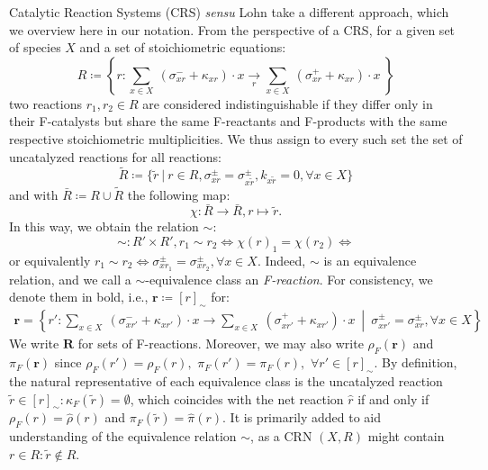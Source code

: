 \documentclass[pdflatex]{sn-jnl}
\theoremstyle{thmstyleone}%
\theoremstyle{examplesty}%
\theoremstyle{thmstylethree}%
\newcommand{\FR}[0]{\mathbf{R}}
\newcommand{\fr}[0]{\mathbf{r}}
\newcommand{\net}[1]{\hat{#1}}
\newcommand{\cat}{\kappa_F}
\newcommand{\ceducts}{\rho}
\newcommand{\cproducts}{\pi}
\newcommand{\feducts}{\rho_F}
\newcommand{\fproducts}{\pi_F}
\newcommand{\holy}[1]{\begingroup\color{royalpurple}#1\endgroup}
\newcommand{\NV}[1]{\begingroup\color{teal}#1\endgroup}
\begin{document}
Catalytic Reaction Systems (CRS) \textit{sensu} Lohn
\cite{lohn_evolving_1998} take a different approach, \NV{which we overview here in our notation}. 
\holy{From the perspective of a CRS, for a given set of species $X$ and a set of stoichiometric equations:
	\begin{equation}
		R\coloneqq \left\{r: \sum_{x\in X}\ (\sigma^-_{xr} + \kappa_{xr}) \cdot x\underset{r}\rightarrow \sum_{x\in X} \ (\sigma^+_{xr} + \kappa_{xr} )\cdot x \  \right\}
	\end{equation}
two reactions $r_1, r_2\in R$ are considered indistinguishable if they differ
only in their F-catalysts but share the same F-reactants and F-products
with the same respective stoichiometric multiplicities. We thus assign to 
every such set the set of uncatalyzed reactions for all reactions: 
\begin{equation}
	\tilde{R}\coloneqq \{\tilde{r} \ | \ r\in R, \sigma^{\pm}_{xr}=\sigma^{\pm}_{x\tilde{r}}, 
	k_{x\tilde{r}}=0, \forall x\in X\}
\end{equation} 
and with $\bar{R}\coloneqq R\cup \tilde{R}$ the following map:
\begin{equation}\label{eq:fEquiv}
  \chi: \bar{R} \rightarrow \bar{R}, r\mapsto \tilde{r}.
\end{equation}
In this way, we obtain the relation $\sim$:
\begin{equation}
	\sim: R' \times R', r_1\sim r_2\Leftrightarrow \chi(r)_1=\chi(r_2) \Leftrightarrow 
\end{equation}
or equivalently $r_1\sim r_2\Leftrightarrow \sigma^\pm_{xr_1}=\sigma^\pm_{xr_2}, \forall x\in X$.}
Indeed, $\sim$ is an equivalence relation, and we call a $\sim$-equivalence
class an \emph{F-reaction}.  For consistency, we denote them in bold, i.e.,
$\fr\coloneqq [r]_\sim$ for:
\begin{equation}\label{eq:fEquivClass}
  \begin{split}
    \fr= \left\{r': \sum_{x\in X}\ (\sigma^-_{xr'} + \kappa_{xr'}) \cdot x \rightarrow \sum_{x\in X} \ (\sigma^+_{xr'} + \kappa_{xr'} )\cdot x \ \middle\vert \ \sigma_{xr'}^{\pm} = \sigma_{xr}^\pm, 	
    \forall x\in X \right\}
  \end{split}
\end{equation}
\NV{W}e write $\FR$ for sets of F-reactions. Moreover, we may also write
$\feducts(\fr)$ and $\fproducts(\fr)$ since $\feducts(r') =\feducts(r),$ $\fproducts(r') =\fproducts(r),$ $\forall r' \in[r]_\sim$. 
\holy{By definition, the natural representative of each equivalence class is the uncatalyzed reaction $\tilde{r}\in [r]_{\sim}:
\cat(\tilde{r}) = \emptyset$, which coincides with the net reaction $\net{r}$ if and only if $\feducts(r)= \net{\ceducts}(r)$ and
$\fproducts(\tilde{r}) = \net{\cproducts}(r)$. It is primarily added to aid understanding of the equivalence relation $\sim$, as
a CRN $(X,R)$ might contain $r\in R: \tilde{r}\notin R$.}
\end{document}
